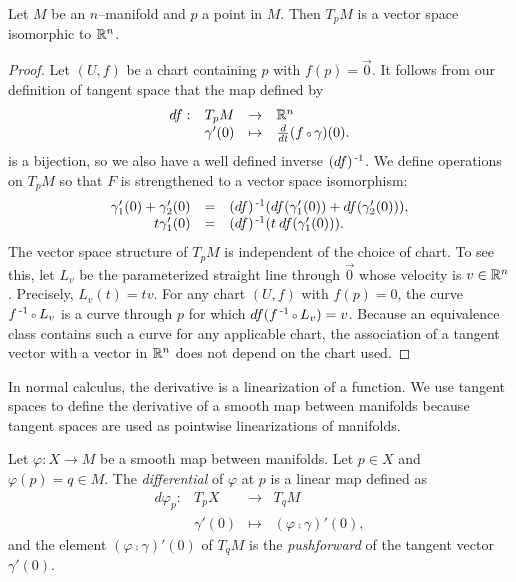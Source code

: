 \begin{prop}
	\label{prop:tangentspacevectorspace}
	Let $M$ be an $n$--manifold and $p$ a point in $M$.
	Then $T_p M$ is a vector space isomorphic to $\mathbb{R}^n$.
\end{prop}

\begin{proof}
	Let $(U,f)$ be a chart containing $p$ with $f(p)=\vec{0}$.
	It follows from our definition of tangent space that the map defined by
	\[
		\begin{array}{crcl}
			df : & T_p M & \to & \RRN \\
			& \gamma'(0) & \mapsto & \Ddt(f\comp \gamma)(0) .
		\end{array}
	\]
	is a bijection, so we also have a well defined inverse $(df)^{\,\text{-}1}$.
	We define operations on $T_p M$ so that $F$ is strengthened to a vector space isomorphism:
	\[
		\begin{array}{rcl}
			\gamma_1'(0)+\gamma_2'(0) & = & (df)^{\,\text{-}1}(df(\gamma_1'(0))+df(\gamma_2'(0))), \\
			t\gamma_1'(0) & = & (df)^{\,\text{-}1}(t\:df(\gamma_1'(0))).
		\end{array}
	\]
	The vector space structure of $T_p M$ is independent of the choice of chart.
	To see this, let $L_v$ be the parameterized straight line through $\vec{0}$ whose velocity is $v\in\mathbb{R}^n$.
	Precisely, $L_v(t)=tv.$
	For any chart $(U,f)$ with $f(p)=0$, the curve $f\inv\comp L_v$ is a curve through $p$ for which $df(f\inv\comp L_v)=v$.
	Because an equivalence class contains such a curve for any applicable chart, the association of a tangent vector with a vector in $\mathbb{R}^n$ does not depend on the chart used.
\end{proof}

In normal calculus, the derivative is a linearization of a function.
We use tangent spaces to define the derivative of a smooth map between manifolds because tangent spaces are used as pointwise linearizations of manifolds.

\begin{defn}[Differential]
	Let $\varphi:X\to M$ be a smooth map between manifolds.
	Let $p\in X$ and $\varphi(p)=q\in M$.
	The \emph{differential} of $\varphi$ at $p$ is a linear map defined as
	\[
		\begin{array}{crcl}
			d\varphi_p: & T_p X & \to & T_q M\\
					  & \gamma'(0) & \mapsto & (\varphi\comp\gamma)'(0),
		\end{array}
	\]
	and the element $(\varphi\comp\gamma)'(0)$ of $T_q M$ is the \emph{pushforward} of the tangent vector $\gamma'(0)$.
\end{defn}

